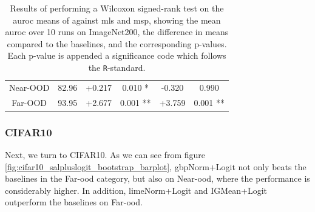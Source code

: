 \documentclass[UKenglish]{uiomasterthesis} %
\theoremstyle{definition}
\begin{document}
\begin{table}[hbtp]
\begin{center}
\begin{tabular}{ |c|c!{\vrule width 1pt}c|c!{\vrule width 1pt}c|c| }
    Near-OOD & 82.96 & +0.217 & 0.010 * & -0.320 & 0.990 \\
    Far-OOD & 93.95 & +2.677 & 0.001 ** & +3.759 & 0.001 ** \\
    \hline
    \end{tabular}
    \caption[Wilcoxon signed-rank test for SaliencyAggregation plus Logit on ImageNet200]{Results of performing a Wilcoxon signed-rank test on the \ac{auroc} means of against \ac{mls} and \ac{msp}, showing the mean \ac{auroc} over 10 runs on ImageNet200, the difference in means compared to the baselines, and the corresponding p-values. Each p-value is appended a significance code which follows the \texttt{R}-standard.}
    \label{table:imagenet200_salpluslogit_ttest}
\end{center}
\setlength\tabcolsep{6pt}
\end{table}

\newpage
%
%
%

\subsubsection{CIFAR10}

Next, we turn to CIFAR10. As we can see from figure \ref{fig:cifar10_salpluslogit_bootstrap_barplot}, \ac{gbp}Norm+Logit not only beats the baselines in the Far-\ac{ood} category, but also on Near-\ac{ood}, where the performance is considerably higher. In addition, \ac{lime}Norm+Logit and IGMean+Logit outperform the baselines on Far-\ac{ood}.
\end{document}
